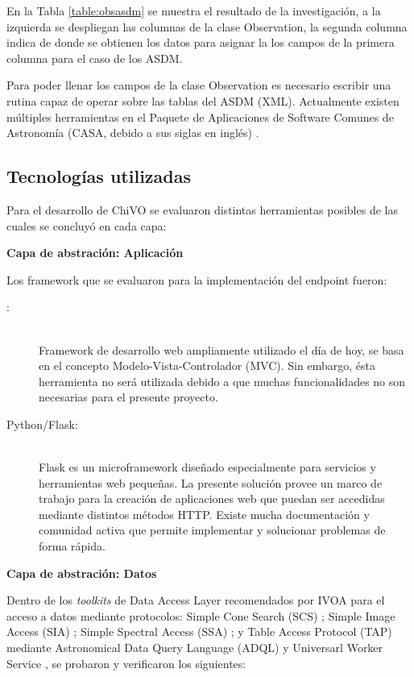 En la Tabla \ref{table:obsasdm} se muestra el resultado de la investigación,
a la izquierda se despliegan las columnas de la clase Observation,
la segunda columna indica de donde se obtienen los datos para asignar la los campos
de la primera columna para el caso de los ASDM.

Para poder llenar los campos de la clase Observation es necesario escribir una
rutina capaz de operar sobre las tablas del ASDM (XML).
Actualmente existen múltiples herramientas en el Paquete de Aplicaciones de Software
Comunes de Astronomía (CASA, debido a sus siglas en inglés) \cite{petry2012analysing}.

\subsection{Tecnologías utilizadas}

Para el desarrollo de ChiVO se evaluaron distintas herramientas posibles de las
cuales se concluyó en cada capa:

\textbf{Capa de abstración: Aplicación}

Los framework que se evaluaron para la implementación del endpoint fueron:

\begin{description}
    \item[{\ror}:] \hfill \\
        Framework de desarrollo web ampliamente utilizado el día de hoy,
        se basa en el concepto Modelo-Vista-Controlador (MVC).
        Sin embargo, ésta herramienta no será utilizada debido
        a que muchas funcionalidades no son necesarias para el presente proyecto.
    \item[Python/Flask:] \hfill \\
        Flask es un microframework diseñado especialmente para servicios y
        herramientas web pequeñas.
        La presente solución provee un marco de trabajo para la creación de
        aplicaciones web que puedan ser accedidas mediante distintos métodos HTTP.
        Existe mucha documentación y comunidad activa que permite implementar y
        solucionar problemas de forma rápida.
\end{description}

\textbf{Capa de abstración: Datos}

Dentro de los \emph{toolkits} de Data Access Layer recomendados por IVOA para el acceso a datos mediante protocolos: Simple Cone Search (SCS) \cite{williams2008simple}; Simple Image Access (SIA) \cite{tody2004simple}; Simple Spectral Access (SSA) \cite{tody2008simple}; y Table Access Protocol (TAP) \cite{dowler2010table} mediante Astronomical Data Query Language (ADQL) \cite{yasuda2004astronomical} y Universarl Worker Service \cite{rixon2008universal}, se probaron y verificaron los siguientes:

